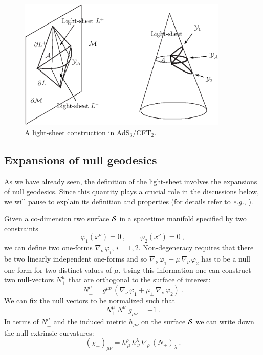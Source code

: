 \documentclass[12pt]{article}
\newcommand{\be}{\begin{equation}}
\newcommand{\ee}{\end{equation}}
\def\({\left (}
\def\){\right )}
\def\eg{{\it e.g.}}
\def\vp{\varphi}
\def\CS{{\cal S}}
\def\ms{\CS}
\def\ads#1{AdS$_{#1}$}
\def\vp{\varphi}
\begin{document}
\begin{figure}
\begin{center}
\includegraphics[width=10cm]{ads3}
\caption{A light-sheet construction in  \ads{3}/CFT$_2$.}
\label{lightsheets}
\end{center}
\end{figure}


\subsection{Expansions of null geodesics}
\label{nexpansion}

As we have already seen, the definition of the
light-sheet involves the expansions of null geodesics. Since this
quantity plays a crucial role in the discussions below, we will
pause to explain its definition and properties (for details
refer to \eg, \cite{Hawking:1973uf, Bousso:2001cf, Ashtekar:2004cn}).

 Given a co-dimension two surface $\ms$ in a spacetime
manifold specified by two constraints
%
\be
\vp_{1}(x^\nu) = 0 \ , \qquad  \vp_{2}(x^\nu) = 0 \ , \ee
%
we can define two one-forms
$\nabla_{\! \nu} \, \vp_{i}$, $i=1,2$. Non-degeneracy requires that there be two
linearly independent one-forms and so $\nabla_{\! \nu} \, \vp_{1} + \mu \,
\nabla_{\! \nu} \, \vp_{2}$ has to be a null one-form for two distinct
values of $\mu$. Using this information one can construct two
null-vectors $N_\pm^\mu$ that are orthogonal to the surface of
interest:
%
\be N_\pm^\mu  =g^{\mu\nu} \, \(\nabla_{\! \nu} \, \vp_{1} + \mu_\pm \,
\nabla_{\! \nu} \, \vp_{2}\)  \ .
\ee
%
We can fix the null vectors to be normalized such that
%
\be N_{+}^\mu \, N_{-}^{\nu} \, g_{\mu\nu} =-1 \ . \ee
%
In terms of $N_\pm^\mu$ and the induced metric $h_{\mu\nu}$ on the surface $\ms$
 we can write down the null extrinsic curvatures:
%
\be (\chi_\pm)_{\mu\nu} = h_{\ \mu}^\rho \,h_{\ \nu}^\lambda \, \nabla_{\! \rho}
\, (N_\pm)_{\lambda} \ . \ee
%
\end{document}
